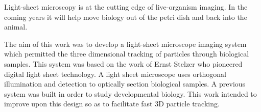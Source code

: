 Light-sheet microscopy is at the cutting edge of live-organism imaging.
In the coming years it will help move biology out of the petri dish and back into the animal.



The aim of this work was to develop a \gls{light-sheet} microscope imaging system which permitted the three dimensional tracking of particles through biological samples.
This system was based on the work of Ernst Stelzer who pioneered digital light sheet technology\cite{Huisken2004}.
A light sheet microscope uses orthogonal illumination and detection to optically section biological samples.
A previous system was built in order to study developmental biology.
This work intended to improve upon this design so as to facilitate fast 3D particle tracking.

\pagebreak
